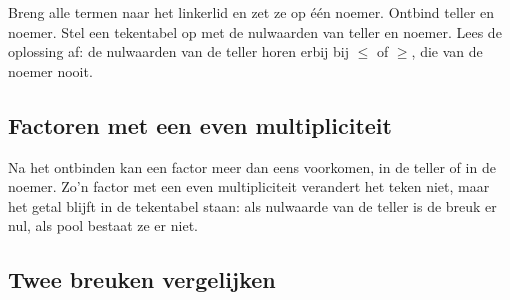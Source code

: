 \begin{werkwijze}
Breng alle termen naar het linkerlid en zet ze op één noemer. Ontbind teller en noemer. Stel een tekentabel op met de nulwaarden van teller en noemer. Lees de oplossing af: de nulwaarden van de teller horen erbij bij $\leqslant$ of $\geqslant$, die van de noemer nooit.
\end{werkwijze}

\begin{oefeningen}
\end{oefeningen}

\subsection{Factoren met een even multipliciteit}

Na het ontbinden kan een factor meer dan eens voorkomen, in de teller of in de noemer. Zo'n factor met een even multipliciteit verandert het teken niet, maar het getal blijft in de tekentabel staan: als nulwaarde van de teller is de breuk er nul, als pool bestaat ze er niet.


\begin{oefeningen}

\end{oefeningen}

\subsection{Twee breuken vergelijken}


